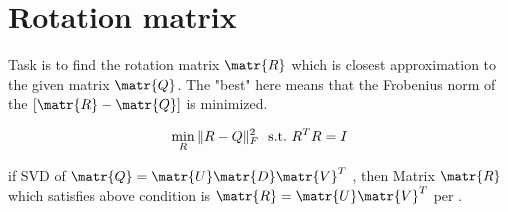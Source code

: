 \section{Rotation matrix}  Task is to find the rotation matrix $\matr{R}$ which is closest approximation to the given matrix $\matr{Q}$. The "best" here means that the Frobenius norm of the $[\matr{R} -  \matr{Q}]$ is minimized. 

\begin{equation*}
	\centering
	\displaystyle \min_{R} \|R - Q\|_{F}^{2}\ \  \textrm{s.t.}\ R^TR = I
\end{equation*}

\noindent if SVD of $ \matr{Q} = \matr{U}\matr{D}\matr{V}^T $ , then Matrix $\matr{R}$ which satisfies above condition is  $\matr{R} = \matr{U}\matr{V}^T$ per \cite{Zhang}.










